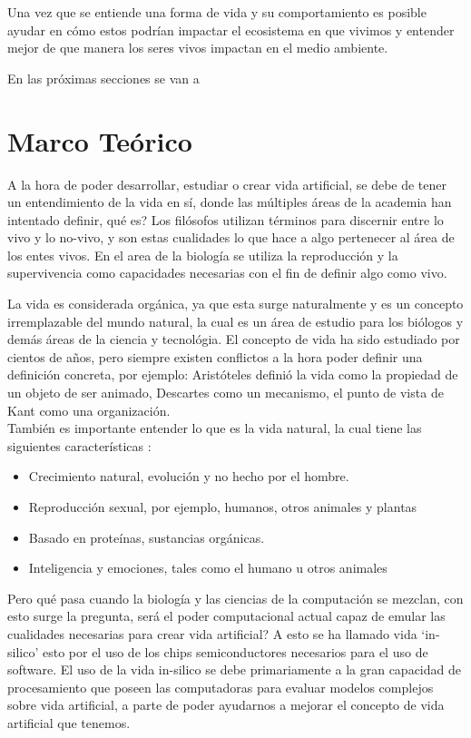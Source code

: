 \documentclass[conference]{IEEEtran}
\begin{document}
Una vez que se entiende una forma de vida y su comportamiento es posible ayudar en c\'omo estos podr\'ian impactar el ecosistema en que vivimos y entender mejor de que manera los seres vivos impactan en el medio ambiente.

En las pr\'oximas secciones se van a 

\section{Marco Te\'orico}



A la hora de poder desarrollar, estudiar o crear vida artificial, se debe de tener un entendimiento de la vida en s\'i, donde las m\'ultiples \'areas de la academia han intentado definir, qu\'e es? Los fil\'osofos utilizan t\'erminos para discernir entre lo vivo y lo no-vivo, y son estas cualidades lo que hace a algo pertenecer al \'area de los entes vivos. \cite{lifeStanfordPhi} En el area de la biolog\'ia se utiliza la reproducci\'on y la supervivencia \cite{artificiallifeLevy} como capacidades necesarias con el fin de definir algo como vivo. 

La vida es considerada org\'anica, ya que esta surge naturalmente y es un concepto irremplazable del mundo natural, la cual es un \'area de estudio para los bi\'ologos y dem\'as \'areas de la ciencia y tecnol\'ogia. El concepto de vida ha sido estudiado por cientos de a\~nos, pero siempre existen conflictos a la hora poder definir una definici\'on concreta, por ejemplo: Arist\'oteles defini\'o la vida como la propiedad de un objeto de ser animado, Descartes como un mecanismo, el punto de vista de Kant como una organizaci\'on. \cite{lifeStanfordPhi} \\
Tambi\'en es importante entender lo que es la vida natural, la cual tiene las siguientes caracter\'isticas \cite{XUY01} :
\begin{itemize}
\item Crecimiento natural, evoluci\'on y no hecho por el hombre.
\item Reproducci\'on sexual, por ejemplo, humanos, otros animales y plantas
\item Basado en prote\'inas, sustancias org\'anicas.
\item Inteligencia y emociones, tales como el humano u otros animales
\end{itemize}

Pero qu\'e pasa cuando la biolog\'ia y las ciencias de la computaci\'on se mezclan, con esto surge la pregunta, ser\'a el poder computacional actual capaz de emular las cualidades necesarias para crear vida artificial? A esto se ha llamado vida `in-silico' \cite{artificiallifeLevy, lifeStanfordPhi} esto por el uso de los chips semiconductores necesarios para el uso de software. El uso de la vida in-silico se debe primariamente a la gran capacidad de procesamiento que poseen las computadoras para evaluar modelos complejos sobre vida artificial, a parte de poder ayudarnos a mejorar el concepto de vida artificial que tenemos. 
\end{document}
